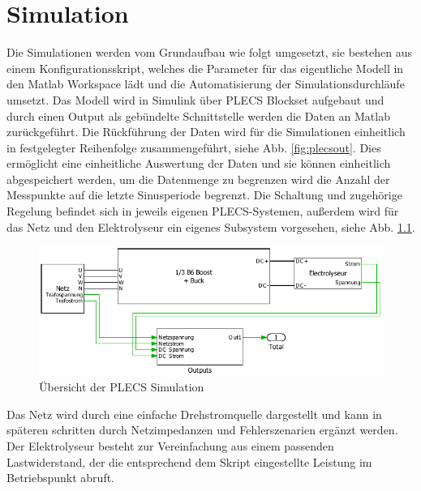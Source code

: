\chapter{Simulation}
Die Simulationen werden vom Grundaufbau wie folgt umgesetzt, sie bestehen aus einem Konfigurationsskript, welches die Parameter für das eigentliche Modell in den Matlab Workspace lädt und die Automatisierung der Simulationsdurchläufe umsetzt. Das Modell wird in Simulink über PLECS Blockset aufgebaut und durch einen Output als gebündelte Schnittstelle werden die Daten an Matlab zurückgeführt. Die Rückführung der Daten wird für die Simulationen einheitlich in festgelegter Reihenfolge zusammengeführt, siehe Abb. \ref{fig:plecsout}. Dies ermöglicht eine einheitliche Auswertung der Daten und sie können einheitlich abgespeichert werden, um die Datenmenge zu begrenzen wird die Anzahl der Messpunkte auf die letzte Sinusperiode begrenzt. Die Schaltung und zugehörige Regelung befindet sich in jeweils eigenen PLECS-Systemen, außerdem wird für das Netz und den Elektrolyseur ein eigenes Subsystem vorgesehen, siehe Abb. \ref{fig:plecssimulationsaufbau}.  
\begin{figure}[H]
\centering
\includegraphics[width=0.9\linewidth]{content/Grafiken/PLECS_Simulationsaufbau}
\caption[Übersicht der PLECS Simulation]{Übersicht der PLECS Simulation}
\label{fig:plecssimulationsaufbau}
\end{figure}
Das Netz wird durch eine einfache Drehstromquelle dargestellt und kann in späteren schritten durch Netzimpedanzen und Fehlerszenarien ergänzt werden. Der Elektrolyseur besteht zur Vereinfachung aus einem passenden Lastwiderstand, der die entsprechend dem Skript eingestellte Leistung im Betriebspunkt abruft. 
